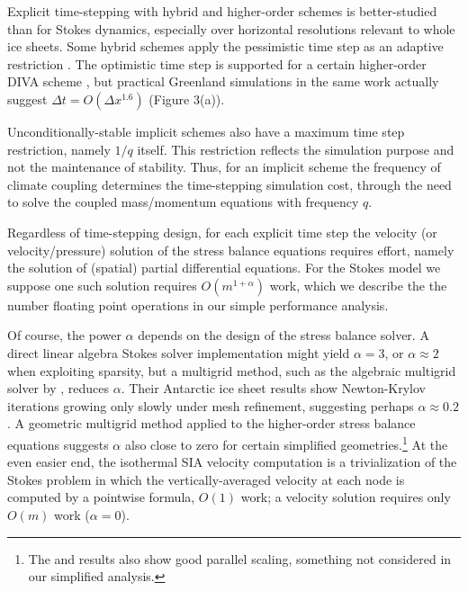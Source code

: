 \documentclass[twocolumn,letterpaper]{igs}
\begin{document}
Explicit time-stepping with hybrid and higher-order schemes is better-studied than for Stokes dynamics, especially over horizontal resolutions relevant to whole ice sheets.  Some hybrid schemes apply the pessimistic time step as an adaptive restriction \citep{Winkelmannetal2011}.  The optimistic time step is supported for a certain higher-order DIVA scheme \citep[see equation (52)]{Robinsonetal2022}, but practical Greenland simulations in the same work actually suggest $\Delta t = O(\Delta x^{1.6})$ (Figure 3(a)).

Unconditionally-stable implicit schemes also have a maximum time step restriction, namely $1/q$ itself.  This restriction reflects the simulation purpose and not the maintenance of stability.  Thus, for an implicit scheme the frequency of climate coupling determines the time-stepping simulation cost, through the need to solve the coupled mass/momentum equations with frequency $q$.

Regardless of time-stepping design, for each explicit time step the velocity (or velocity/pressure) solution of the stress balance equations requires effort, namely the solution of (spatial) partial differential equations.  For the Stokes model we suppose one such solution requires $O(m^{1+\alpha})$ work, which we describe the the number floating point operations in our simple performance analysis.

Of course, the power $\alpha$ depends on the design of the stress balance solver.  A direct linear algebra Stokes solver implementation might yield $\alpha=3$, or $\alpha \approx 2$ when exploiting sparsity, but a multigrid method, such as the algebraic multigrid \citep{Trottenbergetal2001} solver by \cite{IsaacStadlerGhattas2015}, reduces $\alpha$.  Their Antarctic ice sheet results show Newton-Krylov iterations \citep{Bueler2021} growing only slowly under mesh refinement, suggesting perhaps $\alpha\approx 0.2$ \citep[see Table 8.1]{IsaacStadlerGhattas2015}.
A geometric multigrid method applied to the higher-order stress balance equations \citep{BrownSmithAhmadia2013} suggests $\alpha$ also close to zero for certain simplified geometries.\footnote{The \cite{IsaacStadlerGhattas2015} and \cite{BrownSmithAhmadia2013} results also show good parallel scaling, something not considered in our simplified analysis.}  At the even easier end, the isothermal SIA velocity computation is a trivialization of the Stokes problem in which the vertically-averaged velocity at each node is computed by a pointwise formula, $O(1)$ work; a velocity solution requires only $O(m)$ work ($\alpha=0$).
\end{document}
